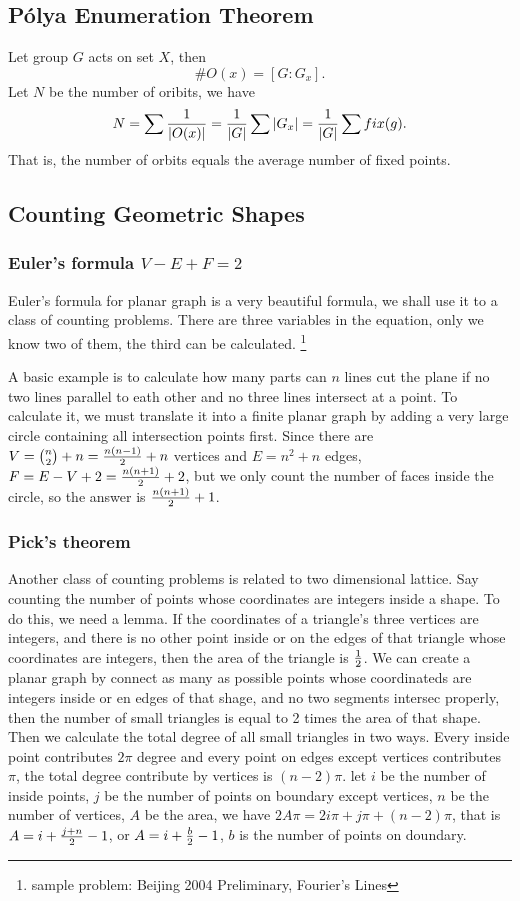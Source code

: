 \subsection{P\'olya Enumeration Theorem}
Let group $G$ acts on set $X$, then $$\#O(x)=[G:G_x].$$
Let $N$ be the number of oribits, we have
$$N=\sum{1\over \left| O(x)\right|}
={1\over{\left| G\right|}}\sum{\left| G_x\right|}
={1\over{\left| G\right|}}\sum fix(g).$$
That is, the number of orbits equals the average number of fixed points.

\subsection{Counting Geometric Shapes}
\subsubsection{Euler's formula $V-E+F=2$}
Euler's formula for planar graph is a very beautiful formula,
we shall use it to a class of counting problems.
There are three variables in the equation, only we know two of them, the third can be calculated.
\footnote{sample problem: Beijing 2004 Preliminary, Fourier's Lines}

A basic example is to calculate how many parts can $n$ lines cut the plane if no two lines parallel
to eath other and no three lines intersect at a point. To calculate it, we must translate it into a
finite planar graph by adding a very large circle containing all intersection points first.
Since there are $V={n\choose 2}+n={n(n-1)\over 2} + n$ vertices
and $E=n^{2} + n$ edges, $F=E-V+2={n(n+1)\over 2} + 2$, but we only count the number of faces inside the
circle, so the answer is ${n(n+1)\over 2} + 1$.

\subsubsection{Pick's theorem}
Another class of counting problems is related to two dimensional lattice.
Say counting the number of points whose coordinates are integers inside a shape.
To do this, we need a lemma. If the coordinates of a triangle's three vertices are integers,
and there is no other point inside or on the edges of that triangle whose coordinates are integers,
then the area of the triangle is ${1\over 2}$. We can create a planar graph by connect as many as possible
points whose coordinateds are integers inside or en edges of that shage,
and no two segments intersec properly, then the number of small triangles is equal to 2 times the area of that shape.
Then we calculate the total degree of all small triangles in two ways.
Every inside point contributes $2\pi$ degree and every point on edges except vertices contributes $\pi$,
the total degree contribute by vertices is $(n-2)\pi$.
let $i$ be the number of inside points,
$j$ be the number of points on boundary except vertices,
$n$ be the number of vertices,
$A$ be the area, we have $2A\pi = 2i\pi + j\pi + (n-2)\pi$,
that is $A=i+{j+n\over 2}-1$, or $A=i+{b\over 2}-1$,
$b$ is the number of points on doundary.

